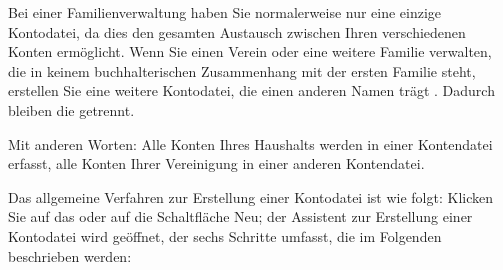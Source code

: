 Bei einer Familienverwaltung haben Sie normalerweise nur eine einzige Kontodatei, da dies den gesamten Austausch zwischen Ihren verschiedenen Konten ermöglicht. Wenn Sie einen Verein oder eine weitere Familie verwalten, die in keinem buchhalterischen Zusammenhang mit der ersten Familie steht, erstellen Sie eine weitere Kontodatei, die einen anderen Namen trägt . Dadurch bleiben die  getrennt. %

Mit anderen Worten: Alle Konten Ihres Haushalts werden in einer Kontendatei erfasst, alle Konten Ihrer Vereinigung in einer anderen Kontendatei.%


Das allgemeine Verfahren zur Erstellung einer Kontodatei ist wie folgt: Klicken Sie auf das  oder auf die Schaltfläche Neu; der Assistent zur Erstellung einer Kontodatei wird geöffnet, der sechs Schritte umfasst, die im Folgenden beschrieben werden:

